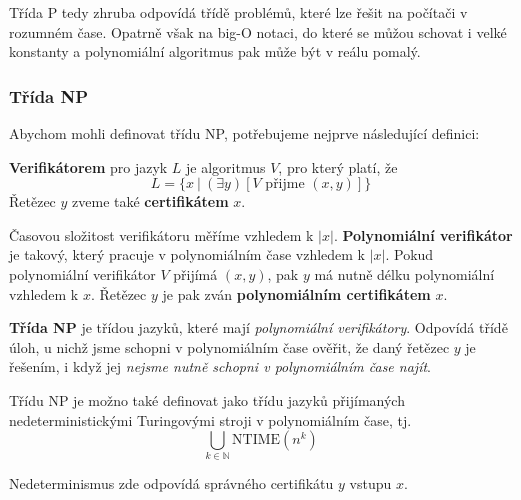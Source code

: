 \documentclass[11pt]{report} %
\newcommand{\N}{\mathbb{N}}
\begin{document}
Třída P tedy zhruba odpovídá třídě problémů, které lze řešit na počítači v rozumném čase. Opatrně však na big-O notaci, do které se můžou schovat i velké konstanty a polynomiální algoritmus pak může být v reálu pomalý.

\subsubsection{Třída NP}
Abychom mohli definovat třídu NP, potřebujeme nejprve následující definici:

\textbf{Verifikátorem} pro jazyk $L$ je algoritmus $V$, pro který platí, že
$$L = \{x\ |\ (\exists y)[V \text{ přijme } (x, y)]\}$$
Řetězec $y$ zveme také \textbf{certifikátem} $x$.

Časovou složitost verifikátoru měříme vzhledem k $|x|$. \textbf{Polynomiální verifikátor} je takový, který pracuje v polynomiálním čase vzhledem k $|x|$. Pokud polynomiální verifikátor $V$ přijímá $(x, y)$, pak $y$ má nutně délku polynomiální vzhledem k $x$. Řetězec $y$ je pak zván \textbf{polynomiálním certifikátem} $x$.	

\textbf{Třída NP} je třídou jazyků, které mají \textit{polynomiální verifikátory}. Odpovídá třídě úloh, u nichž jsme schopni v polynomiálním čase ověřit, že daný řetězec $y$ je řešením, i když jej \textit{nejsme nutně schopni v polynomiálním čase najít}.

Třídu NP je možno také definovat jako třídu jazyků přijímaných nedeterministickými Turingovými stroji v polynomiálním čase, tj. 
$$\bigcup_{k\in\N}\text{NTIME}(n^k) $$

Nedeterminismus zde odpovídá  správného certifikátu $y$ vstupu $x$.
\end{document}

